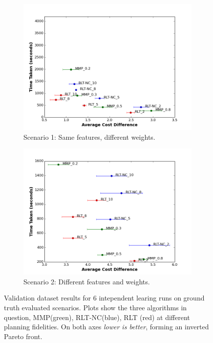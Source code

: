 \documentclass{article}  %
\begin{document}
	\begin{figure}[tbh]
	\centering
	\captionsetup[subfigure]{justification=centering}
	\hspace{-1cm}
      \begin{subfigure}[b]{0.41\columnwidth}
    \includegraphics[scale=0.25]{images/pf_same.png}
    \caption{Scenario 1: Same features, different weights.}
    \label{fig:res_sim1}
  \end{subfigure}
     	\hspace{10mm}
  \begin{subfigure}[b]{0.41\columnwidth}

    \includegraphics[scale=0.25]{images/pf_different.png}
    \caption{Scenario 2: Different features and weights.}
    \label{fig:res_sim2}
  \end{subfigure} 
    \caption{Validation dataset results for 6 intependent learing runs on ground truth evaluated scenarios. Plots show the three algorithms in question, MMP(green), RLT-NC(blue), RLT (red) at different planning fidelities. On both axes \emph{lower is better}, forming an inverted Pareto front.}
    \vspace{-2mm}
  \label{fig:results_sim}
  \end{figure}
\end{document}
